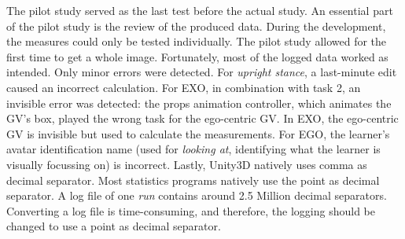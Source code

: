 The pilot study served as the last test before the actual study. An essential part of the pilot study is the review of the produced data. During the development, the measures could only be tested individually. The pilot study allowed for the first time to get a whole image. Fortunately, most of the logged data worked as intended. Only minor errors were detected. For \textit{upright stance}, a last-minute edit caused an incorrect calculation. For EXO, in combination with task 2, an invisible error was detected: the props animation controller, which animates the GV's box, played the wrong task for the ego-centric GV. In EXO, the ego-centric GV is invisible but used to calculate the measurements. For EGO, the learner's avatar identification name (used for \textit{looking at}, identifying what the learner is visually focussing on) is incorrect. Lastly, Unity3D natively uses comma as decimal separator. Most statistics programs natively use the point as decimal separator. A log file of one \textit{run} contains around 2.5 Million decimal separators. Converting a log file is time-consuming, and therefore, the logging should be changed to use a point as decimal separator.

